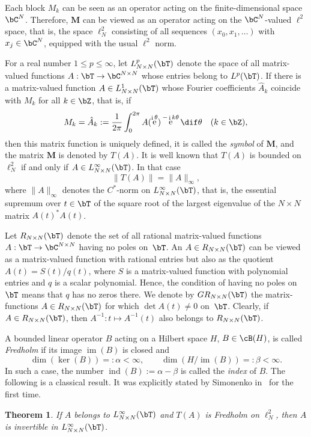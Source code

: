 \documentclass[addpoints,12pt,letter]{article}
\DeclareMathOperator{\e}{e}
\DeclareMathOperator{\im}{im}
\DeclareMathOperator{\ind}{ind}
\DeclareMathOperator{\mi}{i} %
\newcommand{\al}{\alpha}
\newcommand{\be}{\beta}
\newcommand{\nf}{\infty}
\newcommand{\tht}{\theta}
\renewcommand{\d}{\dif}
\renewcommand{\le}{\leqslant}
\numberwithin{equation}{section}
\newtheorem{theorem}[lemma]{Theorem}
\theoremstyle{definition}
\begin{document}
Each block $M_{k}$ can be seen as an operator acting on the finite-dimensional space $\bC^{N}$.
Therefore, $\textbf{M}$ can be viewed as an operator acting on the $\bC^{N}$-valued $\ell^{2}$ space, that is, the space $\ell_{N}^{2}$ consisting of all sequences $(x_{0},x_{1},\ldots)$ with $x_{j}\in\bC^{N}$, equipped with the usual $\ell^{2}$ norm.

For a real number $1\le p\le\nf$, let $L_{N\times N}^{p}(\bT)$ denote the space of all matrix-valued functions $A:\bT\to\bC^{N\times N}$ whose entries belong to $L^{p}(\bT)$.
If there is a matrix-valued function $A\in L_{N\times N}^{1}(\bT)$ whose Fourier coefficients $\hat{A}_{k}$ coincide with $M_{k}$ for all $k\in\bZ$, that is, if
\[
M_{k}=\hat{A}_{k}:=\frac{1}{2\pi}\int_{0}^{2\pi}A(\e^{\mi\tht})\e^{-\mi k\tht}\d\tht\quad(k\in\bZ),
\]
then this matrix function is uniquely defined, it is called the {\em symbol} of $\textbf{M}$, and the matrix $\textbf{M}$ is denoted by $T(A)$.
It is well known that $T(A)$ is bounded on $\ell_{N}^{2}$ if and only if $A\in L_{N\times N}^{\nf}(\bT)$.
In that case
\[
\|T(A)\|=\|A\|_{\nf},
\]
where $\|A\|_{\nf}$ denotes the $C^{\ast}$-norm on $L_{N \times N}^{\nf}(\bT)$, that is, the essential supremum over $t\in\bT$ of the square root of the largest eigenvalue of the $N \times N$ matrix $A(t)^{\ast}A(t)$.

Let $R_{N\times N}(\bT)$ denote the set of all rational matrix-valued functions $A:\bT\to\bC^{N\times N}$ having no poles on~$\bT$.
An $A\in R_{N\times N}(\bT)$ can be viewed as a matrix-valued function with rational entries but also as the quotient $A(t)={S(t)}/{q(t)}$, where $S$ is a matrix-valued function with polynomial entries and $q$ is a scalar polynomial.
Hence, the condition of having no poles on~$\bT$ means that $q$ has no zeros there.
We denote by $GR_{N\times N}(\bT)$ the matrix-functions $A\in R_{N\times N}(\bT)$ for which $\det A(t)\ne 0$ on~$\bT$.
Clearly, if $A\in R_{N\times N}(\bT)$, then $A^{-1}: t \mapsto A^{-1}(t)$ also belongs to $R_{N\times N}(\bT)$.

A bounded linear operator $B$ acting on a Hilbert space $H$, $B\in\cB(H)$, is called {\em Fredholm} if its image $\im(B)$ is closed and
\[
\dim(\ker(B))=:\al<\nf,\qquad
\dim(H/\im(B))=:\be<\nf.
\]
In such a case, the number $\ind(B):=\al-\be$ is called the {\em index} of $B$.
The following is a classical result.
It was explicitly stated by Simonenko in~\cite{Si64} for the first time.

\begin{theorem}\label{th:Sim}
If $A$ belongs to $L_{N\times N}^{\nf}(\bT)$ and $T(A)$ is Fredholm on $\ell_{N}^{2}$, then $A$ is invertible in $L_{N\times N}^{\nf}(\bT)$.
\end{theorem}
\end{document}
